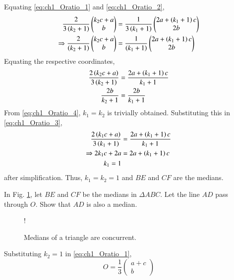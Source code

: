 %
Equating \eqref{eq:ch1_Oratio_1} and \eqref{eq:ch1_Oratio_2},
\begin{align}
\frac{2}{3\left(k_2+1\right)}
\begin{pmatrix}
k_2c+a
\\
b
\end{pmatrix}
&=
\frac{1}{3\left(k_1+1\right)}
\begin{pmatrix}
2a+\left(k_1+1\right)c
\\
2b
\end{pmatrix}
\\
\Rightarrow
\frac{2}{\left(k_2+1\right)}
\begin{pmatrix}
k_2c+a
\\
b
\end{pmatrix}
&=
\frac{1}{\left(k_1+1\right)}
\begin{pmatrix}
2a+\left(k_1+1\right)c
\\
2b
\end{pmatrix}
\end{align}
Equating the respective coordinates,
\begin{align}
\label{eq:ch1_Oratio_3}
\frac{2\left(k_2c+a\right)}{3\left(k_2+1\right)} &= \frac{2a+\left(k_1+1\right)c}{k_1+1}
\\
\frac{2b}{k_2+1} &= \frac{2b}{k_1+1}
\label{eq:ch1_Oratio_4}
\end{align}
From \eqref{eq:ch1_Oratio_4}, $k_1=k_2$ is trivially obtained.  Substituting this in \eqref{eq:ch1_Oratio_3},
\begin{align}
\frac{2\left(k_1c+a\right)}{3\left(k_1+1\right)} &= \frac{2a+\left(k_1+1\right)c}{k_1+1}
\\
\Rightarrow 2k_1c + 2a &= 2a + \left(k_1+1\right)c
\\
k_1 =1
\end{align}
after simplification.  Thus, $k_1=k_2=1$ and $BE$ and $CF$ are the medians.
\begin{problem}
In Fig. \ref{fig:ch1_median_concurrent}, let $BE$ and $CF$ be the medians in $\Delta ABC$.  Let the line $AD$ pass through $O$.  Show that $AD$ is also a median.
\end{problem}
%
\begin{figure}[!h]
\centering
\resizebox {\columnwidth} {!} {

}
\caption{Medians of a triangle are concurrent.}
\label{fig:ch1_median_concurrent}
\end{figure}
\proof
Substituting $k_2=1$  in \eqref{eq:ch1_Oratio_1}, 
\begin{equation}
O = 
\frac{1}{3}
\begin{pmatrix}
a+c
\\
b
\end{pmatrix}
\label{ch1_centroid_1}
\end{equation}
